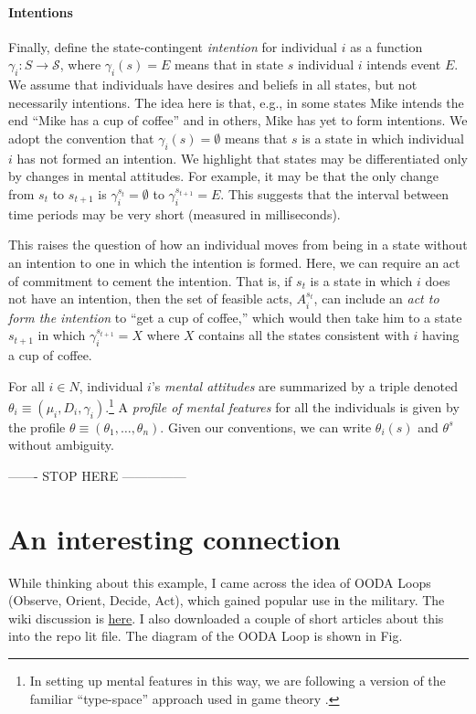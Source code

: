 \documentclass[
11pt,
titlepage,
reqno,
]{article}%
\theoremstyle{definition}
\begin{document}
	\paragraph{Intentions \label{para: intentions}}
	
	Finally, define the state-contingent \textit{intention} for individual $i$ as a function $\gamma_i:S\rightarrow \mathcal{S}$, where $\gamma_i(s)=E$ means that in state $s$ individual $i$ intends event $E$. 
	We assume that individuals have desires and beliefs in all states, but not necessarily intentions. 
	The idea here is that, e.g., in some states Mike intends the end ``Mike has a cup of coffee'' and in others, Mike has yet to form intentions.
	We adopt the convention that $\gamma_i(s)=\emptyset$ means that $s$ is a state in which individual $i$ has not formed an intention. 
	We highlight that states may be differentiated only by changes in mental attitudes. 
	For example, it may be that the only change from $s_t$ to $s_{t+1}$ is $\gamma_i^{s_t}=\emptyset$ to $\gamma_i^{s_{t+1}}=E$.
	This suggests that the interval between time periods may be very short (measured in milliseconds).
	
	This raises the question of how an individual moves from being in a state without an intention to one in which the intention is formed. 
	Here, we can require an act of commitment to cement the intention. 
	That is, if $s_t$ is a state in which $i$ does not have an intention, then the set of feasible acts, $A^{s_t}_i$, can include an \textit{act to form the intention} to ``get a cup of coffee,'' which would then take him to a state $s_{t+1}$ in which $\gamma_i^{s_{t+1}}=X$ where $X$ contains all the states consistent with $i$ having a cup of coffee.
	
	For all $i\in N$, individual $i$'s \textit{mental attitudes} are summarized by a triple denoted $\theta_i\equiv(\mu_i,D_i,\gamma_i)$.\footnote
	{
		In setting up mental features in this way, we are following a version of the familiar ``type-space'' approach used in game theory \citep[See][]{Harsanyi1967, Mertens1985a}. 
	} 
	A \textit{profile of mental features} for all the individuals is given by the profile $\theta\equiv(\theta_1,\ldots,\theta_n)$. 
	Given our conventions, we can write $\theta_i(s)$ and $\theta^s$ without ambiguity.
	
	
	------- STOP HERE ---------------
	
\section{An interesting connection}
While thinking about this example, I came across the idea of OODA Loops (Observe, Orient, Decide, Act), which gained popular use in the military. The wiki discussion is \href{https://en.wikipedia.org/wiki/OODA_loop}{here}. I also downloaded a couple of short articles about this into the repo lit file. The diagram of the OODA Loop  is shown in Fig. 
\end{document}
